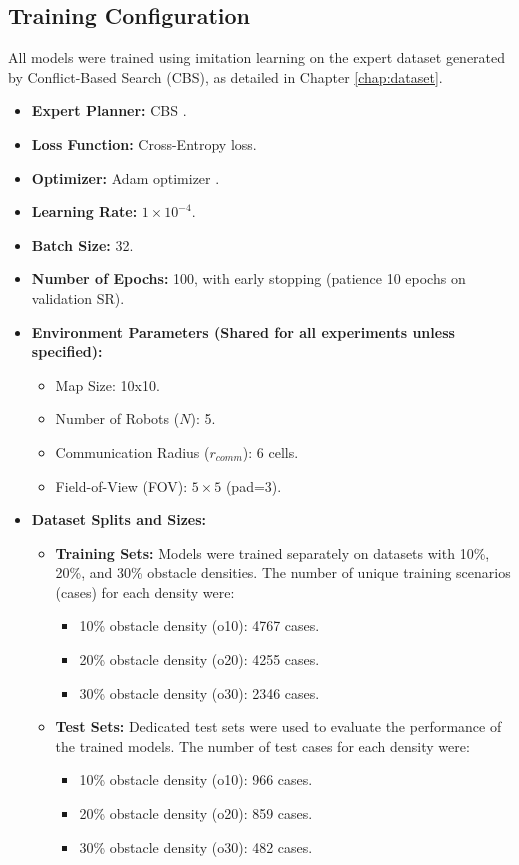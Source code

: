 \subsection{Training Configuration}
\label{subsec:training_config}
All models were trained using imitation learning on the expert dataset generated by Conflict-Based Search (CBS), as detailed in Chapter \ref{chap:dataset}.
\begin{itemize}
    \item \textbf{Expert Planner:} CBS \cite{Sharon2015CBS}.
    \item \textbf{Loss Function:} Cross-Entropy loss.
    \item \textbf{Optimizer:} Adam optimizer \cite{Kingma2014Adam}.
    \item \textbf{Learning Rate:} $1 \times 10^{-4}$.
    \item \textbf{Batch Size:} 32.
    \item \textbf{Number of Epochs:} 100, with early stopping (patience 10 epochs on validation SR).
    \item \textbf{Environment Parameters (Shared for all experiments unless specified):}
        \begin{itemize}
            \item Map Size: 10x10.
            \item Number of Robots ($N$): 5.
            \item Communication Radius ($r_{comm}$): 6 cells.
            \item Field-of-View (FOV): $5 \times 5$ (pad=3).
        \end{itemize}
    \item \textbf{Dataset Splits and Sizes:}
    \begin{itemize}
        \item \textbf{Training Sets:} Models were trained separately on datasets with 10\%, 20\%, and 30\% obstacle densities. The number of unique training scenarios (cases) for each density were:
            \begin{itemize}
                \item 10\% obstacle density (o10): 4767 cases.
                \item 20\% obstacle density (o20): 4255 cases.
                \item 30\% obstacle density (o30): 2346 cases.
            \end{itemize}

        \item \textbf{Test Sets:} Dedicated test sets were used to evaluate the performance of the trained models. The number of test cases for each density were:
            \begin{itemize}
                \item 10\% obstacle density (o10): 966 cases.
                \item 20\% obstacle density (o20): 859 cases.
                \item 30\% obstacle density (o30): 482 cases.
            \end{itemize}


\end{itemize}
\end{itemize}
